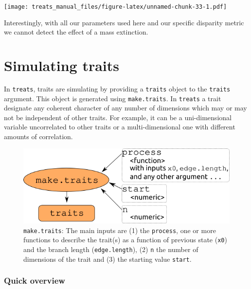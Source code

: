 \documentclass[
]{book}
\begin{document}
\texttt{[image: treats\_manual\_files/figure-latex/unnamed-chunk-33-1.pdf]}

Interestingly, with all our parameters used here and our specific disparity metric we cannot detect the effect of a mass extinction.

\hypertarget{maketraits}{%
\chapter{Simulating traits}\label{maketraits}}

In \texttt{treats}, traits are simulating by providing a \texttt{traits} object to the \texttt{traits} argument.
This object is generated using \texttt{make.traits}.
In \texttt{treats} a trait designate any coherent character of any number of dimensions which may or may not be independent of other traits.
For example, it can be a uni-dimensional variable uncorrelated to other traits or a multi-dimensional one with different amounts of correlation.

\begin{figure}
\centering
\includegraphics{make.traits.png}
\caption{\texttt{make.traits}: The main inputs are (1) the \texttt{process}, one or more functions to describe the trait(s) as a function of previous state (\texttt{x0}) and the branch length (\texttt{edge.length}), (2) \texttt{n} the number of dimensions of the trait and (3) the starting value \texttt{start}.}
\end{figure}

\hypertarget{quick-overview}{%
\subsection{Quick overview}\label{quick-overview}}
\end{document}
